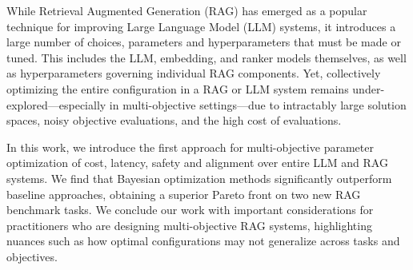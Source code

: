 While Retrieval Augmented Generation (RAG) has emerged as a popular technique for improving Large Language Model (LLM) systems, it introduces a large number of choices, parameters and hyperparameters that must be made or tuned. This includes the LLM, embedding, and ranker models themselves, as well as hyperparameters governing individual RAG components. Yet,  collectively optimizing the entire configuration in a RAG or LLM system remains under-explored---especially in multi-objective settings---due to intractably large solution spaces, noisy objective evaluations, and the high cost of evaluations.

In this work, we introduce the first approach for multi-objective parameter optimization of cost, latency, safety and alignment over entire LLM and RAG systems. We find that Bayesian optimization methods significantly outperform baseline approaches, obtaining a superior Pareto front on two new RAG benchmark tasks. We conclude our work with important considerations for practitioners who are designing multi-objective RAG systems, highlighting nuances such as how optimal configurations may not generalize across tasks and objectives.